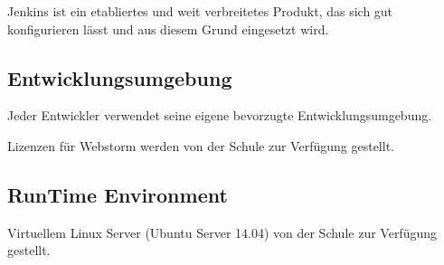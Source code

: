 			Jenkins ist ein etabliertes und weit verbreitetes Produkt, 
			das sich gut konfigurieren lässt und aus diesem Grund eingesetzt wird.


		\subsection{Entwicklungsumgebung}
			Jeder Entwickler verwendet seine eigene bevorzugte Entwicklungsumgebung. 
			
			Lizenzen für Webstorm werden von der Schule zur Verfügung gestellt.


		\subsection{RunTime Environment}
			Virtuellem Linux Server (Ubuntu Server 14.04) von der Schule zur Verfügung gestellt.

